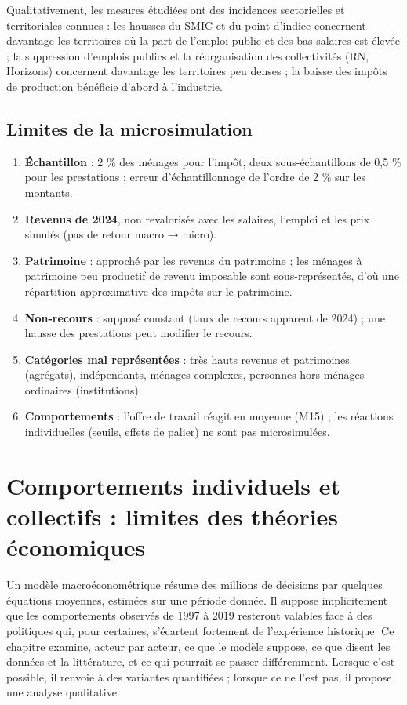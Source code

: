 \documentclass[
  11pt,
  11pt,
  a4paper,
  openany]{book}
\providecommand{\tightlist}{%
  \setlength{\itemsep}{0pt}\setlength{\parskip}{0pt}}
\begin{document}
Qualitativement, les mesures étudiées ont des incidences sectorielles et
territoriales connues : les hausses du SMIC et du point d'indice
concernent davantage les territoires où la part de l'emploi public et
des bas salaires est élevée ; la suppression d'emplois publics et la
réorganisation des collectivités (RN, Horizons) concernent davantage les
territoires peu denses ; la baisse des impôts de production bénéficie
d'abord à l'industrie.

\hypertarget{sec:limites-micro}{%
\section{Limites de la microsimulation}\label{sec:limites-micro}}

\begin{enumerate}
\def\labelenumi{\arabic{enumi}.}
\tightlist
\item
  \textbf{Échantillon} : 2 \% des ménages pour l'impôt, deux
  sous-échantillons de 0,5 \% pour les prestations ; erreur
  d'échantillonnage de l'ordre de 2 \% sur les montants.
\item
  \textbf{Revenus de 2024}, non revalorisés avec les salaires, l'emploi
  et les prix simulés (pas de retour macro → micro).
\item
  \textbf{Patrimoine} : approché par les revenus du patrimoine ; les
  ménages à patrimoine peu productif de revenu imposable sont
  sous-représentés, d'où une répartition approximative des impôts sur le
  patrimoine.
\item
  \textbf{Non-recours} : supposé constant (taux de recours apparent de
  2024) ; une hausse des prestations peut modifier le recours.
\item
  \textbf{Catégories mal représentées} : très hauts revenus et
  patrimoines (agrégats), indépendants, ménages complexes, personnes
  hors ménages ordinaires (institutions).
\item
  \textbf{Comportements} : l'offre de travail réagit en moyenne (M15) ;
  les réactions individuelles (seuils, effets de palier) ne sont pas
  microsimulées.
\end{enumerate}

\hypertarget{sec:comportements}{%
\chapter{Comportements individuels et collectifs : limites des théories
économiques}\label{sec:comportements}}

Un modèle macroéconométrique résume des millions de décisions par
quelques équations moyennes, estimées sur une période donnée. Il suppose
implicitement que les comportements observés de 1997 à 2019 resteront
valables face à des politiques qui, pour certaines, s'écartent fortement
de l'expérience historique. Ce chapitre examine, acteur par acteur, ce
que le modèle suppose, ce que disent les données et la littérature, et
ce qui pourrait se passer différemment. Lorsque c'est possible, il
renvoie à des variantes quantifiées ; lorsque ce ne l'est pas, il
propose une analyse qualitative.
\end{document}
